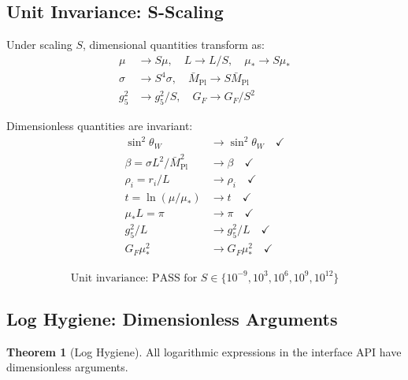 \documentclass[11pt,a4paper]{article}
\theoremstyle{definition}
\newtheorem{theorem}{Theorem}[section]
\begin{document}
\subsection{Unit Invariance: S-Scaling}
\label{subsec:unit_inv}

Under scaling $S$, dimensional quantities transform as:
\begin{align}
\label{eq:S_scaling_1}
\mu &\to S\mu, \quad L \to L/S, \quad \mu_* \to S\mu_* \\
\label{eq:S_scaling_2}
\sigma &\to S^4\sigma, \quad \bar{M}_{\text{Pl}} \to S\bar{M}_{\text{Pl}} \\
\label{eq:S_scaling_3}
g_5^2 &\to g_5^2/S, \quad G_F \to G_F/S^2
\end{align}

Dimensionless quantities are invariant:
\begin{align}
\label{eq:inv_quantities_1}
\sin^2\theta_W &\to \sin^2\theta_W \quad \checkmark \\
\label{eq:inv_quantities_2}
\beta = \sigma L^2/\bar{M}_{\text{Pl}}^2 &\to \beta \quad \checkmark \\
\label{eq:inv_quantities_3}
\rho_i = r_i/L &\to \rho_i \quad \checkmark \\
\label{eq:inv_quantities_4}
t = \ln(\mu/\mu_*) &\to t \quad \checkmark \\
\label{eq:inv_quantities_5}
\mu_* L = \pi &\to \pi \quad \checkmark \\
\label{eq:inv_quantities_6}
g_5^2/L &\to g_5^2/L \quad \checkmark \\
\label{eq:inv_quantities_7}
G_F\mu_*^2 &\to G_F\mu_*^2 \quad \checkmark
\end{align}

\begin{equation}
\label{eq:unit_inv_test}
\boxed{\text{Unit invariance: PASS for } S \in \{10^{-9}, 10^3, 10^6, 10^9, 10^{12}\}}
\end{equation}

\subsection{Log Hygiene: Dimensionless Arguments}
\label{subsec:log_hygiene}

\begin{theorem}[Log Hygiene]
\label{thm:log_hygiene}
All logarithmic expressions in the interface API have dimensionless arguments.
\end{theorem}
\end{document}
